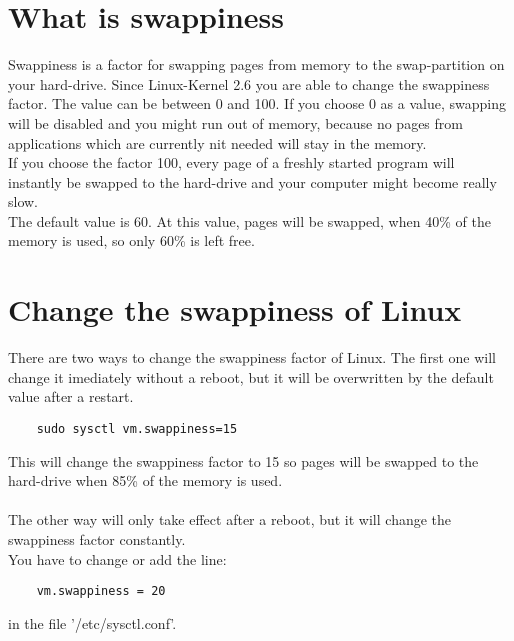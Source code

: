 \documentclass[a4paper, oneside]{scrreprt}
\author{Andre Brand}
\begin{document}
\chapter{What is swappiness}

Swappiness is a factor for swapping pages from memory to the swap-partition on your hard-drive. Since Linux-Kernel 2.6 you are able to change the swappiness factor. The value can be between 0 and 100. If you choose 0 as a value, swapping will be disabled and you might run out of memory, because no pages from applications which are currently nit needed will stay in the memory.\\
If you choose the factor 100, every page of a freshly started program will instantly be swapped to the hard-drive and your computer might become really slow.\\
The default value is 60. At this value, pages will be swapped, when 40\% of the memory is used, so only 60\% is left free.

\chapter{Change the swappiness of Linux}

There are two ways to change the swappiness factor of Linux. The first one will change it imediately without a reboot, but it will be overwritten by the default value after a restart.
\begin{verbatim}
    sudo sysctl vm.swappiness=15
\end{verbatim}
This will change the swappiness factor to 15 so pages will be swapped to the hard-drive when 85\% of the memory is used.\\
\\
The other way will only take effect after a reboot, but it will change the swappiness factor constantly.\\
You have to change or add the line:
\begin{verbatim}
    vm.swappiness = 20
\end{verbatim}
in the file '/etc/sysctl.conf'.
\end{document}
